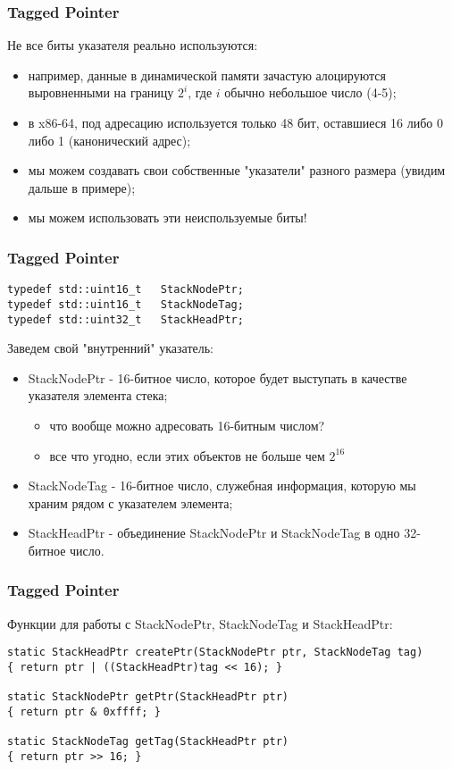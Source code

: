 \begin{frame}
\frametitle{Tagged Pointer}

Не все биты указателя реально используются:
\begin{itemize}
  \item например, данные в динамической памяти зачастую алоцируются выровненными на границу $2^i$, где $i$ обычно небольшое число (4-5);
  \item в x86-64, под адресацию используется только 48 бит, оставшиеся 16 либо 0 либо 1 (канонический адрес);
  \item мы можем создавать свои собственные "указатели" разного размера (увидим дальше в примере);
  \item<2-> мы можем использовать эти неиспользуемые биты!
\end{itemize}
\end{frame}

\begin{frame}[fragile]
\frametitle{Tagged Pointer}

\begin{lstlisting}
typedef std::uint16_t   StackNodePtr;
typedef std::uint16_t   StackNodeTag;
typedef std::uint32_t   StackHeadPtr;
\end{lstlisting}

Заведем свой "внутренний" указатель:
\begin{itemize}
  \item StackNodePtr - 16-битное число, которое будет выступать в качестве указателя элемента стека;
    \begin{itemize}
      \item что вообще можно адресовать 16-битным числом?
      \item<2-> все что угодно, если этих объектов не больше чем $2^{16}$
    \end{itemize}
  \item<3-> StackNodeTag - 16-битное число, служебная информация, которую мы храним рядом с указателем элемента;
  \item<4-> StackHeadPtr - объединение StackNodePtr и StackNodeTag в одно 32-битное число.
\end{itemize}
\end{frame}

\begin{frame}[fragile]
\frametitle{Tagged Pointer}

Функции для работы с StackNodePtr, StackNodeTag и StackHeadPtr:
\begin{lstlisting}
static StackHeadPtr createPtr(StackNodePtr ptr, StackNodeTag tag)
{ return ptr | ((StackHeadPtr)tag << 16); }

static StackNodePtr getPtr(StackHeadPtr ptr)
{ return ptr & 0xffff; }

static StackNodeTag getTag(StackHeadPtr ptr)
{ return ptr >> 16; }
\end{lstlisting}
\end{frame}

